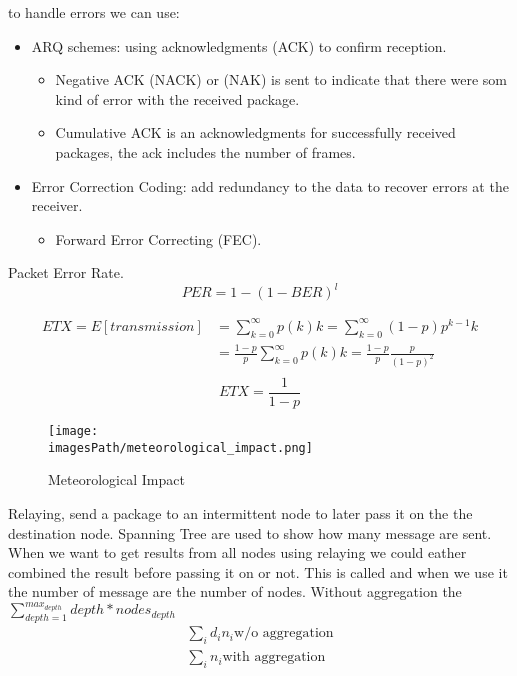  to handle errors we can use:
\begin{itemize}
    \item ARQ schemes: using acknowledgments (ACK) to confirm reception.
    \begin{itemize}
        \item Negative ACK (NACK) or (NAK) is sent to indicate that there were som kind of error with the received package.
        \item Cumulative ACK is an acknowledgments for successfully received packages, the ack includes the number of frames.
    \end{itemize}
    \item Error Correction Coding: add redundancy to the data to recover errors at the receiver.
    \begin{itemize}
        \item Forward Error Correcting (FEC). 
    \end{itemize}
\end{itemize}

Packet Error Rate.
\begin{equation}
    PER = 1 - (1-BER)^l
\end{equation}

\begin{align*}
    ETX = E[transmission] &= \sum_{k=0}^{\infty} p(k)k = \sum_{k=0}^{\infty} (1-p)p^{k-1}k \\
                          &= \frac{1-p}{p}\sum_{k=0}^{\infty} p(k)k = \frac{1-p}{p}\frac{p}{(1-p)^2} \\
\end{align*}
\begin{equation}
    ETX = \frac{1}{1-p}
\end{equation}

\begin{figure}[H]
    \centering
    \texttt{[image: \\imagesPath/meteorological\_impact.png]}
    \caption{Meteorological Impact}
\end{figure}

Relaying, send a package to an intermittent node to later pass it on the the destination node.
Spanning Tree are used to show how many message are sent. 
When we want to get results from all nodes using relaying we could eather 
combined the result before passing it on or not. 
This is called  and when we use it the number of message are 
the number of nodes. Without aggregation the $\sum_{depth=1}^{max_{depth}} depth*nodes_{depth}$
\begin{align*}
    \sum_i d_in_i \text{w/o aggregation} \\
    \sum_i n_i\text{with aggregation} \\
\end{align*}


